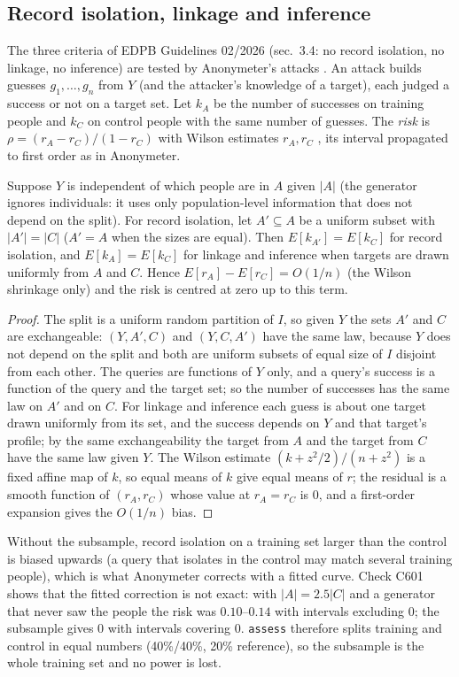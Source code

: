 \subsection{Record isolation, linkage and inference}
The three criteria of EDPB Guidelines 02/2026 \cite{edpb2026} (sec.~3.4: no record isolation, no linkage, no inference) are tested by Anonymeter's attacks \cite{giomi2023}. An attack builds guesses $g_1,\dots,g_n$ from $Y$ (and the attacker's knowledge of a target), each judged a success or not on a target set. Let $k_A$ be the number of successes on training people and $k_C$ on control people with the same number of guesses. The \emph{risk} is $\rho=(r_A-r_C)/(1-r_C)$ with Wilson estimates $r_A,r_C$ \cite{wilson1927}, its interval propagated to first order as in Anonymeter.

\setcounter{proposition}{600}
\begin{proposition}\label{prop:puctrl}
Suppose $Y$ is independent of which people are in $A$ given $|A|$ (the generator ignores individuals: it uses only population-level information that does not depend on the split). For record isolation, let $A'\subseteq A$ be a uniform subset with $|A'|=|C|$ ($A'=A$ when the sizes are equal). Then $E[k_{A'}]=E[k_C]$ for record isolation, and $E[k_A]=E[k_C]$ for linkage and inference when targets are drawn uniformly from $A$ and $C$. Hence $E[r_A]-E[r_C]=O(1/n)$ (the Wilson shrinkage only) and the risk is centred at zero up to this term.
\end{proposition}
\begin{proof}
The split is a uniform random partition of $I$, so given $Y$ the sets $A'$ and $C$ are exchangeable: $(Y,A',C)$ and $(Y,C,A')$ have the same law, because $Y$ does not depend on the split and both are uniform subsets of equal size of $I$ disjoint from each other. The queries are functions of $Y$ only, and a query's success is a function of the query and the target set; so the number of successes has the same law on $A'$ and on $C$. For linkage and inference each guess is about one target drawn uniformly from its set, and the success depends on $Y$ and that target's profile; by the same exchangeability the target from $A$ and the target from $C$ have the same law given $Y$. The Wilson estimate $(k+z^2/2)/(n+z^2)$ is a fixed affine map of $k$, so equal means of $k$ give equal means of $r$; the residual is a smooth function of $(r_A,r_C)$ whose value at $r_A=r_C$ is 0, and a first-order expansion gives the $O(1/n)$ bias.
\end{proof}
\noindent Without the subsample, record isolation on a training set larger than the control is biased upwards (a query that isolates in the control may match several training people), which is what Anonymeter corrects with a fitted curve. Check C601 shows that the fitted correction is not exact: with $|A|=2.5|C|$ and a generator that never saw the people the risk was $0.10$--$0.14$ with intervals excluding $0$; the subsample gives $0$ with intervals covering $0$. \texttt{assess} therefore splits training and control in equal numbers (40\%/40\%, 20\% reference), so the subsample is the whole training set and no power is lost.

